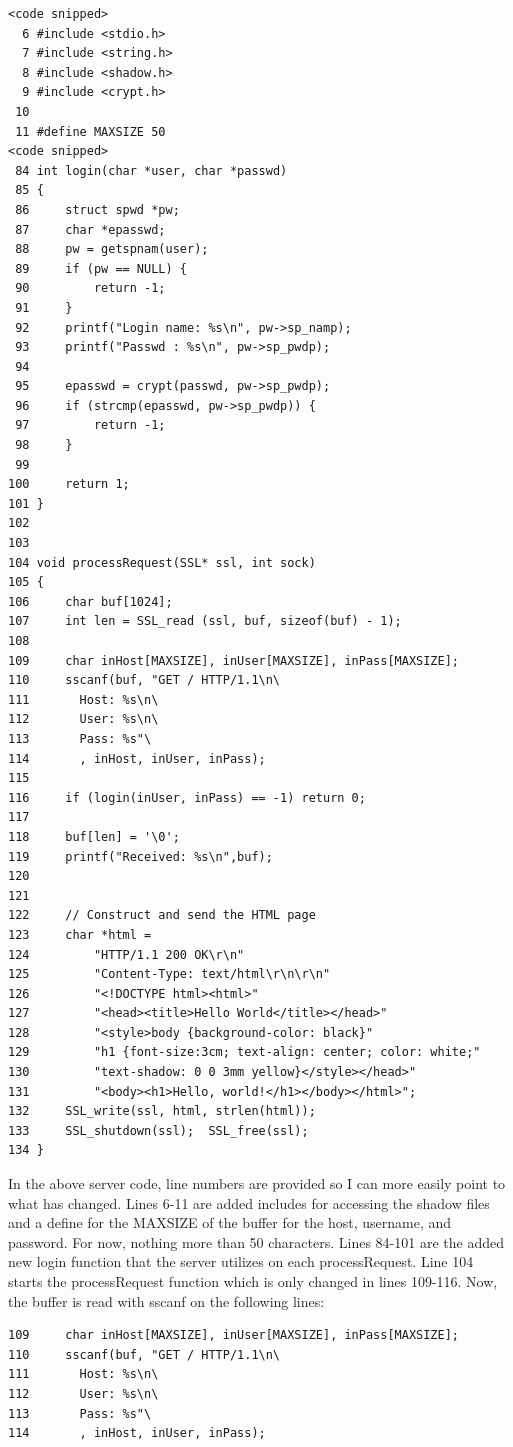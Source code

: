 \documentclass[12pt]{article}
\begin{document}
\begin{verbatim}
<code snipped>
  6 #include <stdio.h>
  7 #include <string.h>
  8 #include <shadow.h>
  9 #include <crypt.h>
 10 
 11 #define MAXSIZE 50
<code snipped>
 84 int login(char *user, char *passwd)
 85 {
 86     struct spwd *pw;
 87     char *epasswd;
 88     pw = getspnam(user);
 89     if (pw == NULL) {
 90         return -1;
 91     }
 92     printf("Login name: %s\n", pw->sp_namp);
 93     printf("Passwd : %s\n", pw->sp_pwdp);
 94 
 95     epasswd = crypt(passwd, pw->sp_pwdp);
 96     if (strcmp(epasswd, pw->sp_pwdp)) {
 97         return -1;
 98     }
 99 
100     return 1;
101 }
102 
103 
104 void processRequest(SSL* ssl, int sock)
105 {
106     char buf[1024];
107     int len = SSL_read (ssl, buf, sizeof(buf) - 1);
108 
109     char inHost[MAXSIZE], inUser[MAXSIZE], inPass[MAXSIZE];
110     sscanf(buf, "GET / HTTP/1.1\n\
111       Host: %s\n\
112       User: %s\n\
113       Pass: %s"\
114       , inHost, inUser, inPass);
115 
116     if (login(inUser, inPass) == -1) return 0;
117 
118     buf[len] = '\0';
119     printf("Received: %s\n",buf);
120 
121 
122     // Construct and send the HTML page
123     char *html =
124         "HTTP/1.1 200 OK\r\n"
125         "Content-Type: text/html\r\n\r\n"
126         "<!DOCTYPE html><html>"
127         "<head><title>Hello World</title></head>"
128         "<style>body {background-color: black}"
129         "h1 {font-size:3cm; text-align: center; color: white;"
130         "text-shadow: 0 0 3mm yellow}</style></head>"
131         "<body><h1>Hello, world!</h1></body></html>";
132     SSL_write(ssl, html, strlen(html));
133     SSL_shutdown(ssl);  SSL_free(ssl);
134 }

\end{verbatim}

In the above server code, line numbers are provided so I can more easily point to what has changed. Lines 6-11 are added includes for accessing the shadow files and a define for the MAXSIZE of the buffer for the host, username, and password. For now, nothing more than 50 characters. Lines 84-101 are the added new login function that the server utilizes on each processRequest. Line 104 starts the processRequest function which is only changed in lines 109-116. Now, the buffer is read with sscanf on the following lines:

\begin{verbatim}
109     char inHost[MAXSIZE], inUser[MAXSIZE], inPass[MAXSIZE];
110     sscanf(buf, "GET / HTTP/1.1\n\
111       Host: %s\n\
112       User: %s\n\
113       Pass: %s"\
114       , inHost, inUser, inPass);
\end{verbatim}
\end{document}
